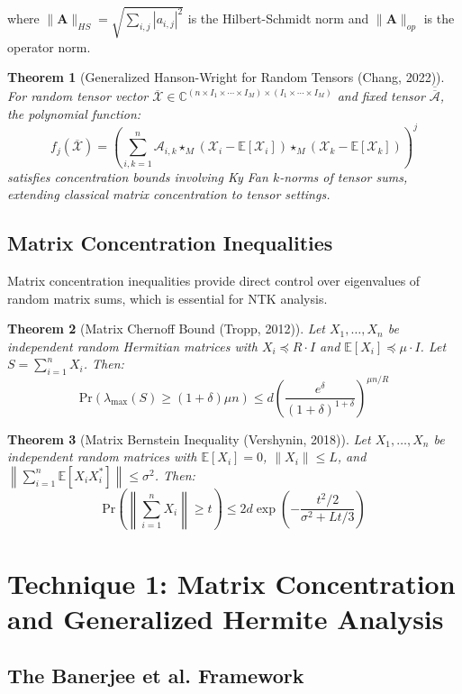 \documentclass{article}
\newtheorem{theorem}{Theorem}[section]
\newcommand{\E}{\mathbb{E}}
\newcommand{\C}{\mathbb{C}}
\newcommand{\Pr}{\text{Pr}}
\begin{document}
where $\|\mathbf{A}\|_{HS} = \sqrt{\sum_{i,j} |a_{i,j}|^2}$ is the Hilbert-Schmidt norm and $\|\mathbf{A}\|_{op}$ is the operator norm.

\begin{theorem}[Generalized Hanson-Wright for Random Tensors (Chang, 2022)]
For random tensor vector $\overline{\mathcal{X}} \in \C^{(n \times I_1 \times \cdots \times I_M) \times (I_1 \times \cdots \times I_M)}$ and fixed tensor $\overline{\overline{\mathcal{A}}}$, the polynomial function:
$$f_j(\overline{\mathcal{X}}) = \left(\sum_{i,k=1}^n \mathcal{A}_{i,k} \star_M (\mathcal{X}_i - \E[\mathcal{X}_i]) \star_M (\mathcal{X}_k - \E[\mathcal{X}_k])\right)^j$$
satisfies concentration bounds involving Ky Fan $k$-norms of tensor sums, extending classical matrix concentration to tensor settings.
\end{theorem}

\subsection{Matrix Concentration Inequalities}

Matrix concentration inequalities provide direct control over eigenvalues of random matrix sums, which is essential for NTK analysis.

\begin{theorem}[Matrix Chernoff Bound (Tropp, 2012)]
Let $X_1, \ldots, X_n$ be independent random Hermitian matrices with $X_i \preceq R \cdot I$ and $\E[X_i] \preceq \mu \cdot I$. Let $S = \sum_{i=1}^n X_i$. Then:
$$\Pr(\lambda_{\max}(S) \geq (1+\delta)\mu n) \leq d \left(\frac{e^\delta}{(1+\delta)^{1+\delta}}\right)^{\mu n / R}$$
\end{theorem}

\begin{theorem}[Matrix Bernstein Inequality (Vershynin, 2018)]
Let $X_1, \ldots, X_n$ be independent random matrices with $\E[X_i] = 0$, $\|X_i\| \leq L$, and $\left\|\sum_{i=1}^n \E[X_i X_i^*]\right\| \leq \sigma^2$. Then:
$$\Pr\left(\left\|\sum_{i=1}^n X_i\right\| \geq t\right) \leq 2d \exp\left(-\frac{t^2/2}{\sigma^2 + Lt/3}\right)$$
\end{theorem}

\section{Technique 1: Matrix Concentration and Generalized Hermite Analysis}

\subsection{The Banerjee et al. Framework}
\end{document}
